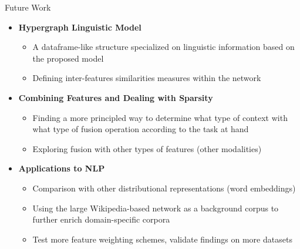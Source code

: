 \documentclass[10pt,=table]{beamer}
\begin{document}
\begin{frame}{Future Work}
\begin{itemize}
\item<1-> \textbf{Hypergraph Linguistic Model}
	\begin{itemize}
	\item<1-> A  dataframe-like structure specialized on linguistic information based on the proposed model
	\item<1-> Defining inter-features similarities measures within the network
	\end{itemize}
\item<2-> \textbf{Combining Features and Dealing with Sparsity}
	\begin{itemize}
	\item<2-> Finding a more principled way to determine what type of
		context with what type of fusion operation according to the task at hand
	\item<2-> Exploring fusion with other types of features (other modalities)  
	\end{itemize}
\item<3-> \textbf{Applications to NLP}
	\begin{itemize}
	\item<3-> Comparison with other distributional representations (word embeddings)
	\item<3-> Using the large Wikipedia-based network as a background corpus to further enrich domain-specific corpora
	\item<3-> Test more feature weighting schemes, validate findings on more datasets
	\end{itemize}
\end{itemize}


\end{frame}
\end{document}
